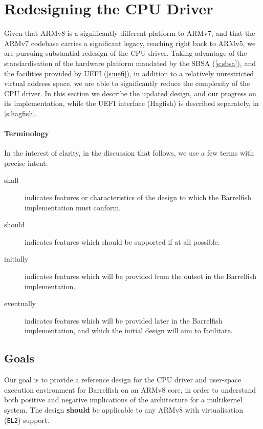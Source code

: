 \documentclass[a4paper,twoside]{report}
\begin{document}
\section{Redesigning the CPU Driver}

Given that ARMv8 is a significantly different platform to ARMv7, and that the
ARMv7 codebase carries a significant legacy, reaching right back to ARMv5, we
are pursuing substantial redesign of the CPU driver. Taking advantage of the
standardisation of the hardware platform mandated by the SBSA
(\autoref{s:sbsa}), and the facilities provided by UEFI (\autoref{s:uefi}), in
addition to a relatively unrestricted virtual address space, we are able to
significantly reduce the complexity of the CPU driver.  In this section we
describe the updated design, and our progress on its implementation, while the
UEFI interface (Hagfish) is described separately, in \autoref{s:hagfish}.

\paragraph{Terminology}
In the interest of clarity, in the discussion that follows, we use a few terms
with precise intent:
\begin{description}
\item[shall]
    indicates features or characteristics of the design to which the
    Barrelfish implementation must conform.
\item[should]
    indicates features which should be supported if at all possible.
\item[initially]
    indicates features which will be provided from the outset in the
    Barrelfish implementation.
\item[eventually]
    indicates features which will be provided later in the Barrelfish
    implementation, and which the initial design will aim to facilitate.
\end{description}

\subsection{Goals}

Our goal is to provide a reference design for the CPU driver and user-space
execution environment for Barrelfish on an ARMv8 core, in order to understand
both positive and negative implications of the architecture for a multikernel
system.  The design \textbf{should} be applicable to any ARMv8 with
virtualisation (\texttt{EL2}) support.
\end{document}
